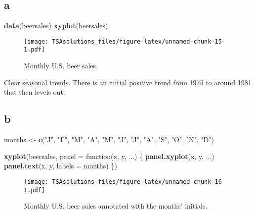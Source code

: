 \documentclass[]{book}
\newenvironment{Shaded}{\begin{snugshade}}{\end{snugshade}}
\newcommand{\KeywordTok}[1]{\textcolor[rgb]{0.13,0.29,0.53}{\textbf{{#1}}}}
\newcommand{\DataTypeTok}[1]{\textcolor[rgb]{0.13,0.29,0.53}{{#1}}}
\newcommand{\StringTok}[1]{\textcolor[rgb]{0.31,0.60,0.02}{{#1}}}
\newcommand{\NormalTok}[1]{{#1}}
\theoremstyle{definition}
\theoremstyle{definition}
\theoremstyle{remark}
\begin{document}
\subsection*{a}\label{a-23}

\begin{Shaded}
\begin{Highlighting}[]
\KeywordTok{data}\NormalTok{(beersales)}
\KeywordTok{xyplot}\NormalTok{(beersales)}
\end{Highlighting}
\end{Shaded}

\begin{figure}[htbp]
\centering
\texttt{[image: TSAsolutions\_files/figure-latex/unnamed-chunk-15-1.pdf]}
\caption{\label{fig:unnamed-chunk-15}Monthly U.S. beer sales.}
\end{figure}

Clear seasonal trends. There is an initial positive trend from 1975 to
around 1981 that then levels out.

\subsection*{b}\label{b-23}

\begin{Shaded}
\begin{Highlighting}[]
\NormalTok{months <-}\StringTok{ }\KeywordTok{c}\NormalTok{(}\StringTok{"J"}\NormalTok{, }\StringTok{"F"}\NormalTok{, }\StringTok{"M"}\NormalTok{, }\StringTok{"A"}\NormalTok{, }\StringTok{"M"}\NormalTok{, }\StringTok{"J"}\NormalTok{, }\StringTok{"J"}\NormalTok{, }\StringTok{"A"}\NormalTok{, }\StringTok{"S"}\NormalTok{, }\StringTok{"O"}\NormalTok{, }\StringTok{"N"}\NormalTok{, }\StringTok{"D"}\NormalTok{)}

\KeywordTok{xyplot}\NormalTok{(beersales,}
       \DataTypeTok{panel =} \NormalTok{function(x, y, ...) \{}
         \KeywordTok{panel.xyplot}\NormalTok{(x, y, ...)}
         \KeywordTok{panel.text}\NormalTok{(x, y, }\DataTypeTok{labels =} \NormalTok{months)}
       \NormalTok{\})}
\end{Highlighting}
\end{Shaded}

\begin{figure}[htbp]
\centering
\texttt{[image: TSAsolutions\_files/figure-latex/unnamed-chunk-16-1.pdf]}
\caption{\label{fig:unnamed-chunk-16}Monthly U.S. beer sales annotated with
the months' initials.}
\end{figure}
\end{document}
